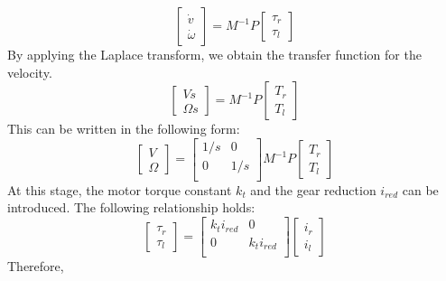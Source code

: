 \documentclass[a4paper, 11pt]{article}
\begin{document}
\begin{equation}
\begin{bmatrix}
\dot{v}\\
\dot{\omega}
\end{bmatrix}
= M^{-1}P
\begin{bmatrix}
\tau_r\\
\tau_l
\end{bmatrix}
\end{equation}
By applying the Laplace transform, we obtain the transfer function for the velocity.
\begin{equation}
\begin{bmatrix}
V s\\
\Omega s
\end{bmatrix}
= 
M^{-1}P
\begin{bmatrix}
T_r\\
T_l
\end{bmatrix}
\end{equation}
This can be written in the following form: 
\begin{equation}
\begin{bmatrix}
V\\
\Omega
\end{bmatrix}
= 
\begin{bmatrix}
1/s & 0 \\
0 & 1/s\\
\end{bmatrix}
M^{-1}P
\begin{bmatrix}
T_r\\
T_l
\end{bmatrix}
\end{equation}
At this stage, the motor torque constant $k_t$ and the gear reduction $i_{red}$ can be introduced. The following relationship holds:
\begin{equation}
\begin{bmatrix}
\tau_r\\
\tau_l
\end{bmatrix}
=
\begin{bmatrix}
k_t i_{red} & 0 \\
0 & k_t i_{red}\\
\end{bmatrix}
\begin{bmatrix}
i_r\\
i_l
\end{bmatrix}
\end{equation}
Therefore, 
\end{document}
